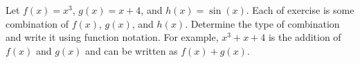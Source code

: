 {Let $f(x)=x^3$, $g(x)=x+4$, and $h(x)=\sin{(x)}$. Each of exercise}
{ is some combination of $f(x)$, $g(x)$, and $h(x)$. Determine the type of combination and write it using function notation. For example, $x^3+x+4$ is the addition of $f(x)$ and $g(x)$ and can be written as $f(x)+g(x)$.  }
